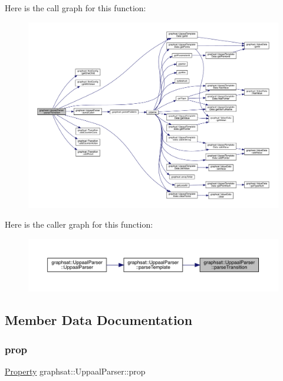 Here is the call graph for this function\+:
\nopagebreak
\begin{figure}[H]
\begin{center}
\leavevmode
\includegraphics[width=350pt]{classgraphsat_1_1_uppaal_parser_a2d1d7098418df34e9ae1e97a23b96e1c_cgraph}
\end{center}
\end{figure}
Here is the caller graph for this function\+:
\nopagebreak
\begin{figure}[H]
\begin{center}
\leavevmode
\includegraphics[width=350pt]{classgraphsat_1_1_uppaal_parser_a2d1d7098418df34e9ae1e97a23b96e1c_icgraph}
\end{center}
\end{figure}


\subsection{Member Data Documentation}
\mbox{\label{classgraphsat_1_1_uppaal_parser_abf98cbefe7cdf29168472c0cb57a4c40}} 
\subsubsection{\texorpdfstring{prop}{prop}}
{\footnotesize\ttfamily \mbox{\hyperlink{classgraphsat_1_1_property}{Property}} graphsat\+::\+Uppaal\+Parser\+::prop\hspace{0.3cm}{\ttfamily [private]}}

